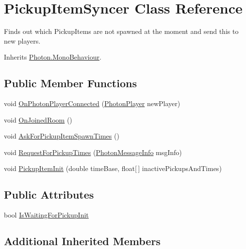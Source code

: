 \hypertarget{class_pickup_item_syncer}{}\section{Pickup\+Item\+Syncer Class Reference}
\label{class_pickup_item_syncer}


Finds out which Pickup\+Items are not spawned at the moment and send this to new players.  




Inherits \hyperlink{class_photon_1_1_mono_behaviour}{Photon.\+Mono\+Behaviour}.

\subsection*{Public Member Functions}
\begin{DoxyCompactItemize}
\item 
void \hyperlink{class_pickup_item_syncer_a03bd1854f3cd463eeb6069d8361f9291}{On\+Photon\+Player\+Connected} (\hyperlink{class_photon_player}{Photon\+Player} new\+Player)
\item 
void \hyperlink{class_pickup_item_syncer_a3d32b13c4ab1ce5ae07bcd53cba4e27e}{On\+Joined\+Room} ()
\item 
void \hyperlink{class_pickup_item_syncer_aa547e02e224afe732975461f6e9b199e}{Ask\+For\+Pickup\+Item\+Spawn\+Times} ()
\item 
void \hyperlink{class_pickup_item_syncer_a8e9a45de2ffa43ff060ac3f7090e9c89}{Request\+For\+Pickup\+Times} (\hyperlink{class_photon_message_info}{Photon\+Message\+Info} msg\+Info)
\item 
void \hyperlink{class_pickup_item_syncer_a4de4ad14f8762a6f4a18206cb043376f}{Pickup\+Item\+Init} (double time\+Base, float\mbox{[}$\,$\mbox{]} inactive\+Pickups\+And\+Times)
\end{DoxyCompactItemize}
\subsection*{Public Attributes}
\begin{DoxyCompactItemize}
\item 
bool \hyperlink{class_pickup_item_syncer_a825d5218c87edf22d2bd28c104017303}{Is\+Waiting\+For\+Pickup\+Init}
\end{DoxyCompactItemize}
\subsection*{Additional Inherited Members}


